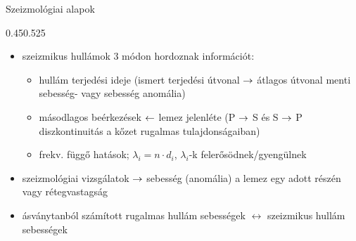 \begin{frame}{Szeizmológiai alapok}
    \begin{figp}{}{\cite{helffrich}}{0.45}{0.525}
        \begin{itemize}
            \item szeizmikus hullámok 3 módon hordoznak információt:
            \begin{itemize}
                \item hullám terjedési ideje (ismert terjedési útvonal $\rightarrow$ átlagos útvonal menti sebesség- vagy sebesség anomália)
                \item másodlagos beérkezések $\leftarrow$ lemez jelenléte (P $\rightarrow$ S és S $\rightarrow$ P diszkontinuitás a kőzet rugalmas tulajdonságaiban)
                \item frekv. függő hatások; $\lambda_i = n \cdot d_i$, $\lambda_i$-k felerősödnek/gyengülnek
            \end{itemize}
            \item szeizmológiai vizsgálatok $\rightarrow$ sebesség (anomália) a lemez egy adott részén vagy rétegvastagság
            \item ásványtanból számított rugalmas hullám sebességek $\leftrightarrow$ szeizmikus hullám sebességek
        \end{itemize}
    \end{figp}
\end{frame}
